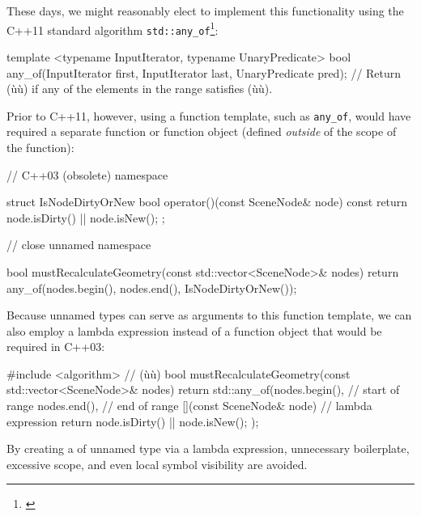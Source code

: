 These days, we might reasonably elect to implement this functionality
using the C++11 standard algorithm
\lstinline!std::any_of!{\cprotect\footnote{\cite{cpprefa}}}:

\begin{emcppslisting}[language=C++]
template <typename InputIterator, typename UnaryPredicate>
bool any_of(InputIterator first, InputIterator last, UnaryPredicate pred);
    // Return (ù{}ù) if any of the elements in the range satisfies (ù{}ù).
\end{emcppslisting}
    
\noindent Prior to C++11, however, using a function template, such as
\lstinline!any_of!, would have required a separate function or
function object (defined \emph{outside} of the scope of the function):

\begin{emcppslisting}[language=C++]
// C++03 (obsolete)
namespace {

struct IsNodeDirtyOrNew
{
    bool operator()(const SceneNode& node) const
    {
        return node.isDirty() || node.isNew();
    }
};

}  // close unnamed namespace

bool mustRecalculateGeometry(const std::vector<SceneNode>& nodes)
{
    return any_of(nodes.begin(), nodes.end(), IsNodeDirtyOrNew());
}
\end{emcppslisting}
    
\noindent Because unnamed types can serve as arguments to this function template, we can also employ a lambda expression instead of a function object that would be required in C++03: 

\begin{emcppslisting}[language=C++]
#include <algorithm> // (ù{}ù)
bool mustRecalculateGeometry(const std::vector<SceneNode>& nodes)
{
    return std::any_of(nodes.begin(),             // start of range
                       nodes.end(),               // end of range
                       [](const SceneNode& node)  // lambda expression
                       {
                           return node.isDirty() || node.isNew();
                       }
                      );
}
\end{emcppslisting}
    
\noindent By creating a  of unnamed type via a lambda
expression, unnecessary boilerplate, excessive scope, and even local
symbol visibility are avoided.

